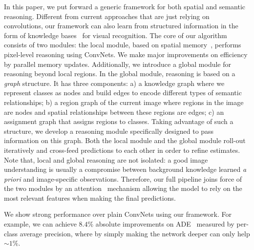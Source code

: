 \documentclass[10pt,twocolumn,letterpaper]{article}
\begin{document}
In this paper, we put forward a generic framework for both spatial and semantic reasoning. Different from current approaches that are just relying on convolutions, our framework can also learn from structured information in the form of knowledge bases~\cite{chen2013neil,zhu2015building} for visual recognition. The core of our algorithm consists of two modules: the local module, based on spatial memory~\cite{chen2017spatial}, performs pixel-level reasoning using ConvNets. We make major improvements on efficiency by parallel memory updates. Additionally, we introduce a global module for reasoning beyond local regions. In the global module, reasoning is based on a \emph{graph} structure. It has three components: a) a knowledge graph where we represent classes as nodes and build edges to encode different types of semantic relationships; b) a region graph of the current image where regions in the image are nodes and spatial relationships between these regions are edges; c) an assignment graph that assigns regions to classes. Taking advantage of such a structure, we develop a reasoning module specifically designed to pass information on this graph. Both the local module and the global module roll-out iteratively and cross-feed predictions to each other in order to refine estimates. Note that, local and global reasoning are not isolated: a good image understanding is usually a compromise between background knowledge learned \emph{a priori} and image-specific observations. Therefore, our full pipeline joins force of the two modules by an attention~\cite{chen2016attention} mechanism allowing the model to rely on the most relevant features when making the final predictions.

We show strong performance over plain ConvNets using our framework. For example, we can achieve $8.4\%$ absolute improvements on ADE~\cite{zhou2016semantic} measured by per-class average precision, where by simply making the network deeper can only help ${\sim}1\%$. 

\vspace{-0.05in}
\end{document}
